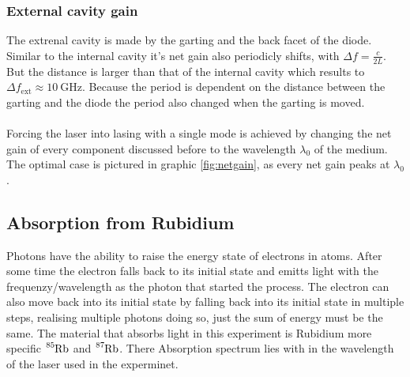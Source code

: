 \subsubsection{External cavity gain}
The extrenal cavity is made by the garting and the back facet of the diode.
Similar to the internal cavity it's net gain also periodicly shifts, with $\Delta f = \frac{c}{2L}$.
\\
But the distance is larger than that of the internal cavity which results to $\Delta f_\text{ext} \approx \SI{10}{\giga\Hz}$.
Because the period is dependent on the distance between the garting and the diode the period also changed when the garting is moved.
\\\\
Forcing the laser into lasing with a single mode is achieved by changing the net gain of every component discussed before to the wavelength $\lambda_0$ of the medium.
The optimal case is pictured in graphic \ref{fig:netgain}, as every net gain peaks at $\lambda_0$.

\subsection{Absorption from Rubidium}
Photons have the ability to raise the energy state of electrons in atoms.
After some time the electron falls back to its initial state and emitts light with the frequenzy/wavelength as the photon that started the process.
The electron can also move back into its initial state by falling back into its initial state in multiple steps, realising multiple photons doing so, just the sum of energy must be the same.
The material that absorbs light in this experiment is Rubidium more specific $\ce{^{85}Rb}$ and $\ce{^{87}Rb}$.
There Absorption spectrum lies with in the wavelength of the laser used in the experminet.
